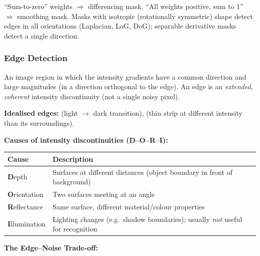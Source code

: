 \begin{tipbox}
``Sum-to-zero'' weights $\Rightarrow$ differencing mask. ``All weights positive, sum to 1'' $\Rightarrow$ smoothing mask. Masks with isotropic (rotationally symmetric) shape detect edges in all orientations (Laplacian, LoG, DoG); separable derivative masks detect a single direction.
\end{tipbox}

\bigseparator

\subsubsection{Edge Detection}

\begin{defbox}[Edge]
An image region in which the intensity gradients have a common direction and large magnitudes (in a direction orthogonal to the edge). An edge is an \emph{extended, coherent} intensity discontinuity (not a single noisy pixel).
\end{defbox}

\textbf{Idealised edges:}  (light $\to$ dark transition),  (thin strip at different intensity than its surroundings).

\separator

\textbf{Causes of intensity discontinuities (D--O--R--I):}

\begin{center}
\renewcommand{\arraystretch}{1.3}
\begin{tabular}{@{} l p{9cm} @{}}
\toprule
\textbf{Cause} & \textbf{Description} \\
\midrule
\textbf{D}epth & Surfaces at different distances (object boundary in front of background) \\
\textbf{O}rientation & Two surfaces meeting at an angle \\
\textbf{R}eflectance & Same surface, different material/colour properties \\
\textbf{I}llumination & Lighting changes (e.g.\ shadow boundaries); usually \emph{not} useful for recognition \\
\bottomrule
\end{tabular}
\end{center}

\separator

\textbf{The Edge--Noise Trade-off:}

